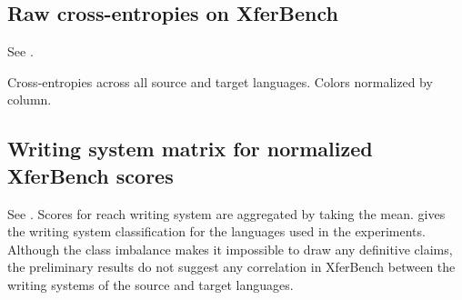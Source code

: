 \subsection{Raw cross-entropies on XferBench}
\unskip\label{sec:clm-all}
See .
\begin{table}
  \centering
  \caption{Cross-entropies across all source and target languages. Colors normalized by column.}
  \unskip\label{tab:clm-all}
\end{table}

\subsection{Writing system matrix for normalized XferBench scores}
\unskip\label{sec:clm-writing-system}

See .
Scores for reach writing system are aggregated by taking the mean.
 gives the writing system classification for the languages used in the experiments.
Although the class imbalance makes it impossible to draw any definitive claims, the preliminary results do not suggest any correlation in XferBench between the writing systems of the source and target languages.


